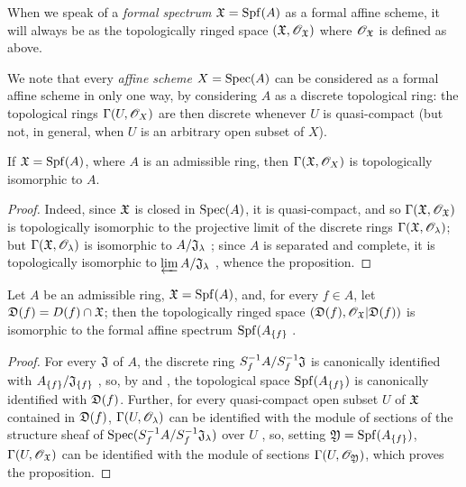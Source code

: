 When we speak of a \emph{formal spectrum $\mathfrak{X}={\mathop{\mathrm{Spf}}\nolimits}(A)$} as a formal affine scheme, it will always be as the topologically ringed space $(\mathfrak{X},\mathscr{O}_\mathfrak{X})$ where $\mathscr{O}_\mathfrak{X}$ is defined as above.

We note that every \emph{affine scheme} $X={\mathop{\mathrm{Spec}}\nolimits}(A)$ can be considered as a formal affine scheme in only one way, by considering $A$ as a discrete topological ring: the topological rings $\Gamma(U,\mathscr{O}_X)$ are then discrete whenever $U$ is quasi-compact (but not, in general, when $U$ is an arbitrary open subset of $X$).

\begin{prop}[10.1.3]
\label{1.10.1.3}
If $\mathfrak{X}={\mathop{\mathrm{Spf}}\nolimits}(A)$, where $A$ is an admissible ring, then $\Gamma(\mathfrak{X},\mathscr{O}_X)$ is topologically isomorphic to $A$.
\end{prop}

\begin{proof}
\label{proof-1.10.1.3}
Indeed, since $\mathfrak{X}$ is closed in ${\mathop{\mathrm{Spec}}\nolimits}(A)$, it is quasi-compact, and so $\Gamma(\mathfrak{X},\mathscr{O}_\mathfrak{X})$ is topologically isomorphic to the projective limit of the discrete rings $\Gamma(\mathfrak{X},\mathscr{O}_\lambda)$; but $\Gamma(\mathfrak{X},\mathscr{O}_\lambda)$ is isomorphic to $A/\mathfrak{J}_\lambda$ ; since $A$ is separated and complete, it is topologically isomorphic to $\varprojlim A/\mathfrak{J}_\lambda$ , whence the proposition.
\end{proof}

\begin{prop}[10.1.4]
\label{1.10.1.4}
Let $A$ be an admissible ring, $\mathfrak{X}={\mathop{\mathrm{Spf}}\nolimits}(A)$, and, for every $f\in A$, let $\mathfrak{D}(f)=D(f)\cap\mathfrak{X}$; then the topologically ringed space $(\mathfrak{D}(f),\mathscr{O}_\mathfrak{X}|\mathfrak{D}(f))$ is isomorphic to the formal affine spectrum ${\mathop{\mathrm{Spf}}\nolimits}(A_{\{f\}}$ .
\end{prop}

\begin{proof}
\label{proof-1.10.1.4}
For every  $\mathfrak{J}$ of $A$, the discrete ring $S_f^{-1}A/ S_f^{-1}\mathfrak{J}$ is canonically identified with $A_{\{f\}}/\mathfrak{J}_{\{f\}}$ , so, by  and , the topological space ${\mathop{\mathrm{Spf}}\nolimits}(A_{\{f\}})$ is canonically identified with $\mathfrak{D}(f)$.
Further, for every quasi-compact open subset $U$ of $\mathfrak{X}$ contained in $\mathfrak{D}(f)$, $\Gamma(U,\mathscr{O}_\lambda)$ can be identified with the module of sections of the structure sheaf of ${\mathop{\mathrm{Spec}}\nolimits}(S_f^{-1}A/ S_f^{-1}\mathfrak{J}_\lambda)$ over $U$ , so, setting $\mathfrak{Y}={\mathop{\mathrm{Spf}}\nolimits}(A_{\{f\}})$, $\Gamma(U,\mathscr{O}_\mathfrak{X})$ can be identified with the module of sections $\Gamma(U,\mathscr{O}_\mathfrak{Y})$, which proves the proposition.
\end{proof}

